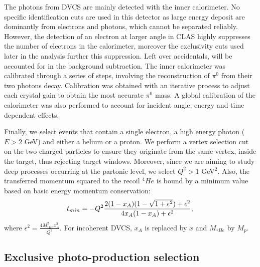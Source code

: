 \documentclass[aps,prc,preprint,superscriptaddress]{revtex4}
\begin{document}
The photons from DVCS are mainly detected with the inner calorimeter. No specific 
identification cuts are used in this detector as large energy deposit are dominantly 
from electrons and photons, which cannot be separated reliably. However, the detection 
of an electron at larger angle in CLAS 
highly suppresses the number of electrons in the calorimeter, moreover
the exclusivity cuts used later in the analysis further this suppression. Left over accidentals, will be
accounted for in the background subtraction. The inner calorimeter was calibrated through a series
of steps, involving the reconstruction of $\pi^0$ from their two photons decay. Calibration was obtained 
with an iterative process to adjust each crystal gain to obtain the most accurate $\pi^0$ mass. A
global calibration of the calorimeter was also performed to account for incident angle, energy and 
time dependent effects.

Finally, we select events that contain a single electron, a high energy photon ($E>2$ GeV) and
either a helium or a proton. We perform a vertex selection cut on the two charged particles 
to ensure they originate from the same vertex, inside the target, thus rejecting target windows.
Moreover, since we are aiming to study deep processes occurring at the partonic level, we select
$Q^2>1$ GeV$^2$. Also, the transferred momentum squared to the recoil $^{4}He$ is bound by
   a minimum value based on basic energy momentum conservation:
\begin{equation}
   t_{min} = - Q^{2} \frac{2(1- x_{A})(1 - \sqrt{1 + \epsilon ^{2}}) + \epsilon 
   ^{2}}{4 x_{A}(1-x_{A})+ \epsilon ^{2}},\\
\end{equation}
where $\epsilon ^{2} = \frac{4M^{2}_{^4\!He}x^{2}_{A}}{Q^{2}}$. For incoherent DVCS, 
$x_A$ is replaced by $x$ and $M_{^4\!He}$ by $M_{p}$. 

\subsection{Exclusive photo-production selection}
\end{document}
